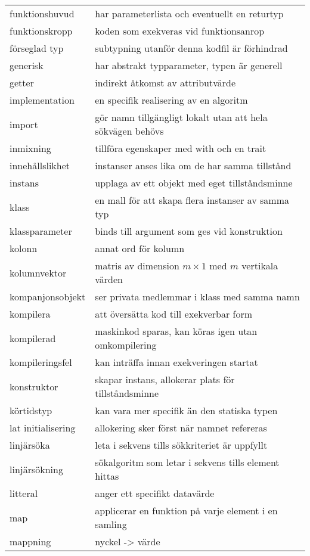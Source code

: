 \begin{tabular}{l|l}
funktionshuvud & har parameterlista och eventuellt en returtyp \\
funktionskropp & koden som exekveras vid funktionsanrop \\
förseglad typ & subtypning utanför denna kodfil är förhindrad \\
generisk & har abstrakt typparameter, typen är generell \\
getter & indirekt åtkomst av attributvärde \\
implementation & en specifik realisering av en algoritm \\
import & gör namn tillgängligt lokalt utan att hela sökvägen behövs \\
inmixning & tillföra egenskaper med with och en trait \\
innehållslikhet & instanser anses lika om de har samma tillstånd \\
instans & upplaga av ett objekt med eget tillståndsminne \\
klass & en mall för att skapa flera instanser av samma typ \\
klassparameter & binds till argument som ges vid konstruktion \\
kolonn & annat ord för kolumn \\
kolumnvektor & matris av dimension $m\times{}1$ med $m$ vertikala värden \\
kompanjonsobjekt & ser privata medlemmar i klass med samma namn \\
kompilera & att översätta kod till exekverbar form \\
kompilerad & maskinkod sparas, kan köras igen utan omkompilering \\
kompileringsfel & kan inträffa innan exekveringen startat \\
konstruktor & skapar instans, allokerar plats för tillståndsminne \\
körtidstyp & kan vara mer specifik än den statiska typen \\
lat initialisering & allokering sker först när namnet refereras \\
linjärsöka & leta i sekvens tills sökkriteriet är uppfyllt \\
linjärsökning & sökalgoritm som letar i sekvens tills element hittas \\
litteral & anger ett specifikt datavärde \\
map & applicerar en funktion på varje element i en samling \\
mappning & nyckel -> värde \\

\end{tabular}
